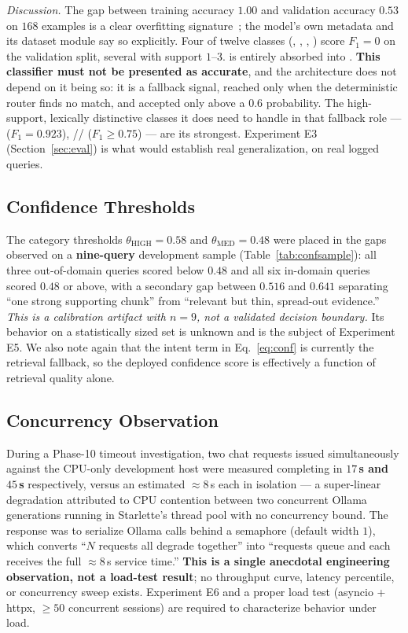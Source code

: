 \emph{Discussion.} The gap between training accuracy $1.00$ and validation
accuracy $0.53$ on $168$ examples is a clear overfitting
signature~\cite{goodfellow2016deep}; the model's own metadata and its
dataset module say so explicitly. Four of twelve classes
(, , ,
) score $F_1 = 0$ on the validation split, several with
support $1$--$3$.  is entirely absorbed into
. \textbf{This classifier must not be presented
as accurate}, and the architecture does not depend on it being so: it is a
fallback signal, reached only when the deterministic router finds no match,
and accepted only above a $0.6$ probability. The high-support, lexically
distinctive classes it does need to handle in that fallback role ---
 ($F_1 = 0.923$), //
 ($F_1 \ge 0.75$) --- are its strongest. Experiment E3
(Section~\ref{sec:eval}) is what would establish real generalization, on
real logged queries.

\subsection{Confidence Thresholds}
The category thresholds $\theta_{\text{HIGH}} = 0.58$ and
$\theta_{\text{MED}} = 0.48$ were placed in the gaps observed on a
\textbf{nine-query} development sample (Table~\ref{tab:confsample}): all
three out-of-domain queries scored below $0.48$ and all six in-domain
queries scored $0.48$ or above, with a secondary gap between $0.516$ and
$0.641$ separating ``one strong supporting chunk'' from ``relevant but
thin, spread-out evidence.'' \emph{This is a calibration artifact with
$n = 9$, not a validated decision boundary.} Its behavior on a
statistically sized set is unknown and is the subject of Experiment E5. We
also note again that the intent term in Eq.~\eqref{eq:conf} is currently
the retrieval fallback, so the deployed confidence score is effectively a
function of retrieval quality alone.

\subsection{Concurrency Observation}
During a Phase-10 timeout investigation, two chat requests issued
simultaneously against the CPU-only development host were measured
completing in \textbf{$17$\,s and $45$\,s} respectively, versus an
estimated $\approx 8$\,s each in isolation --- a super-linear degradation
attributed to CPU contention between two concurrent Ollama generations
running in Starlette's thread pool with no concurrency bound. The response
was to serialize Ollama calls behind a semaphore (default width $1$), which
converts ``$N$ requests all degrade together'' into ``requests queue and
each receives the full $\approx 8$\,s service time.'' \textbf{This is a
single anecdotal engineering observation, not a load-test result}; no
throughput curve, latency percentile, or concurrency sweep exists.
Experiment E6 and a proper load test (asyncio + httpx, $\ge 50$ concurrent
sessions) are required to characterize behavior under load.

